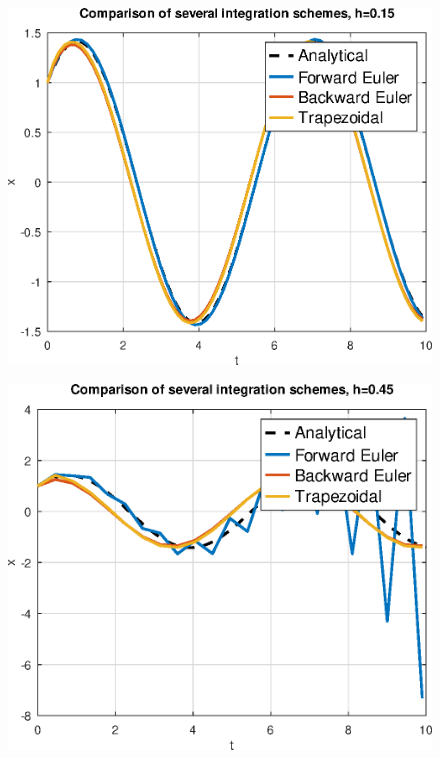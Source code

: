 \documentclass[11pt]{report}
\theoremstyle{definition}
\begin{document}
\begin{figure}[H]
	\includegraphics[width=\textwidth]{integration_0.15.eps}
\end{figure}
\begin{figure}[H]
	\includegraphics[width=\textwidth]{integration_0.45.eps}
\end{figure}
\end{document}
